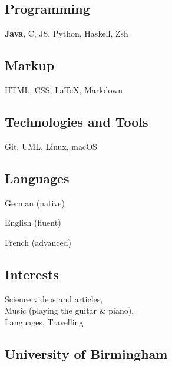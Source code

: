 \documentclass[]{jonas-cv}
\begin{document}
\begin{minipage}[t]{0.33\textwidth} 


\tinysectionsep
\subsection{Programming}
\textbf{Java}, C, JS, Python, Haskell, Zsh
\sectionsep

\subsection{Markup}
HTML, CSS, \LaTeX, Markdown
\sectionsep

\subsection{Technologies and Tools}
Git, UML, Linux, macOS
\sectionsep

\subsection{Languages}
\tinysectionsep
\tinysectionsep
\begin{tightemize}
    \item German (native)
    \item English (fluent)
    \item French (advanced)
\end{tightemize}
\sectionsep

\subsection{Interests}
Science videos and articles,\\
Music (playing the guitar \& piano),\\
Languages, Travelling
\largesectionsep

\tinysectionsep
\vspace{0.25mm}
\subsection{University of Birmingham}
\sectionsep


\end{minipage}
\end{document}
